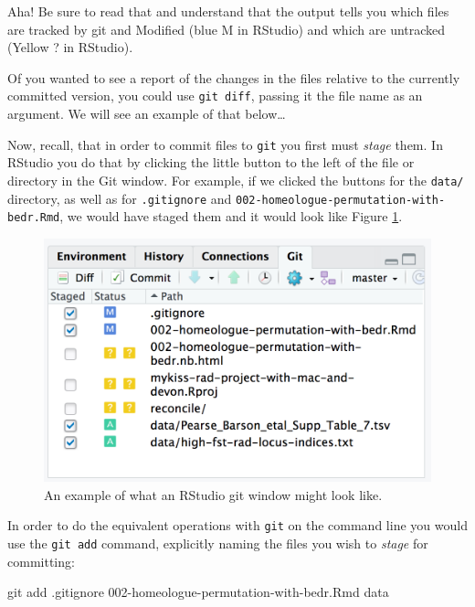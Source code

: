 \documentclass[]{krantz}
\makeatletter
\newenvironment{Shaded}{\begin{snugshade}}{\end{snugshade}}
\newcommand{\FunctionTok}[1]{\textcolor[rgb]{0,0,0}{#1}}
\newcommand{\NormalTok}[1]{#1}
\newenvironment{kframe}{%
\medskip{}
\setlength{\fboxsep}{.8em}
 \def\at@end@of@kframe{}%
 \ifinner\ifhmode%
  \def\at@end@of@kframe{\end{minipage}}%
  \begin{minipage}{\columnwidth}%
 \fi\fi%
 \def\FrameCommand##1{\hskip\@totalleftmargin \hskip-\fboxsep
 \colorbox{shadecolor}{##1}\hskip-\fboxsep
     \hskip-\linewidth \hskip-\@totalleftmargin \hskip\columnwidth}%
 \MakeFramed {\advance\hsize-\width
   \@totalleftmargin\z@ \linewidth\hsize
   \@setminipage}}%
 {\par\unskip\endMakeFramed%
 \at@end@of@kframe}
\renewenvironment{Shaded}{\begin{kframe}}{\end{kframe}}
\makeatother
\begin{document}
Aha! Be sure to read that and understand that the output tells you which
files are tracked by git and Modified (blue M in RStudio) and which
are untracked (Yellow ? in RStudio).

Of you wanted to see a report of the changes in the files relative
to the currently committed version, you could use \texttt{git\ diff}, passing
it the file name as an argument. We will see an example of that below\ldots{}

Now, recall, that in order to commit files to \texttt{git} you first must
\emph{stage} them. In RStudio you do that by clicking the little button to
the left of the file or directory in the Git window. For example,
if we clicked the buttons for the \texttt{data/} directory, as well as for
\texttt{.gitignore} and \texttt{002-homeologue-permutation-with-bedr.Rmd}, we would
have staged them and it would look like Figure \ref{fig:git-staged}.

\begin{figure}

{\centering \includegraphics{figs/git-staged} 

}

\caption{An example of what an RStudio git window might look like.}\label{fig:git-staged}
\end{figure}

In order to do the equivalent operations with \texttt{git} on the command line
you would use the \texttt{git\ add} command, explicitly naming the files you wish to
\emph{stage} for committing:

\begin{Shaded}
\begin{Highlighting}[]
\FunctionTok{git}\NormalTok{ add .gitignore 002-homeologue-permutation-with-bedr.Rmd data}
\end{Highlighting}
\end{Shaded}
\end{document}
